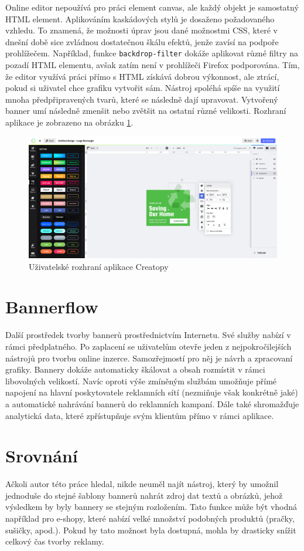 Online editor nepoužívá pro práci element canvas, ale každý objekt je samostatný HTML element. Aplikováním kaskádových stylů je dosaženo požadovaného vzhledu.
To znamená, že možnosti úprav jsou dané možnostmi CSS, které v dnešní době sice zvládnou dostatečnou škálu efektů, jenže zavísí na podpoře prohlížečem.
Například, funkce \texttt{backdrop-filter} dokáže aplikovat různé filtry na pozadí HTML elementu, avšak zatím není v prohlížeči Firefox podporována.
Tím, že editor využívá práci přímo s HTML získává dobrou výkonnost, ale ztrácí, pokud si uživatel chce grafiku vytvořit sám.
Nástroj spoléhá spíše na využití mnoha předpřipravených tvarů, které se následně dají upravovat. Vytvořený banner umí následně zmenšit nebo
zvětšit na ostatní různé velikosti. Rozhraní aplikace je zobrazeno na obrázku \ref{fig:creatopy}.

\begin{figure}
    \centering
    \includegraphics[width=.8\textwidth]{Figures/creatopy.png}
    \caption[Creatopy]{Uživatelské rozhraní aplikace Creatopy}
    \label{fig:creatopy}
\end{figure}


\section{Bannerflow}
Další prostředek tvorby bannerů prostřednictvím Internetu. Své služby nabízí v rámci předplatného.
Po zaplacení se uživatelům otevře jeden z nejpokročilejších nástrojů pro tvorbu online inzerce.
Samozřejmostí pro něj je návrh a zpracovaní grafiky. Bannery dokáže automaticky škálovat a obsah rozmístit v rámci libovolných velikostí.
Navíc oproti výše zmíněným službám umožňuje přímé napojení na hlavní poskytovatele reklamních sítí (nezmiňuje však konkrétně jaké) a
automatické nahrávání bannerů do reklamních kampaní. Dále také shromažďuje analytická data, které zpřístupňuje svým klientům přímo v rámci aplikace.

\section{Srovnání}
Ačkoli autor této práce hledal, nikde neuměl najít nástroj, který by umožnil jednoduše do stejné šablony bannerů nahrát zdroj dat textů a obrázků,
jehož výsledkem by byly bannery se stejným rozložením. Tato funkce může být vhodná například pro e-shopy,
které nabízí velké množství podobných produktů (pračky, sušičky, apod.). Pokud by tato možnost byla dostupná,
mohla by drasticky snížit celkový čas tvorby reklamy. 



\endinput